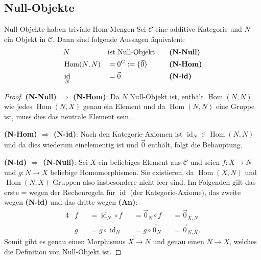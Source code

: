 \documentclass[a4paper]{amsart}
\theoremstyle{definition}
\DeclareMathOperator{\id}{id}
\DeclareMathOperator{\Hom}{Hom}
\newcommand{\CC}{\ensuremath{\mathcal{ C }}}
\begin{document}
\subsection{Null-Objekte}
\begin{Satz}{Null-Objekte haben triviale Hom-Mengen}
   Sei $\CC$ eine additive Kategorie und $N$ ein Objekt in $\CC$. Dann sind folgende Aussagen äquivalent:
   \begin{alignat}{3}
      &N            && \text{ist Null-Objekt}  &&\quad \text{\textbf{(N-Null)}}\\
      &\Hom( N, N ) && = 0^G := \{ \vec 0   \} &&\quad \text{\textbf{(N-Hom)}}\\
      &\id_N        && = \vec 0                &&\quad \text{\textbf{(N-id)}}
   \end{alignat}
\end{Satz}
\begin{proof}
   \textbf{(N-Null) $\Rightarrow$ (N-Hom)}: Da $N$ Null-Objekt ist, enthält $\Hom(N,N)$ wie jedes $\Hom(N,X)$ genau ein Element und da $\Hom(N,N)$ eine Gruppe ist, muss dies das neutrale Element sein.
   
   \textbf{(N-Hom) $\Rightarrow$ (N-id)}: Nach den Kategorie-Axiomen ist $\id_N \in \Hom(N,N)$ und da dies wiederum einelementig ist und $\vec 0$ enthält, folgt die Behauptung.
   
   \textbf{(N-id) $\Rightarrow$ (N-Null)}: Sei $X$ ein beliebiges Element aus $\CC$ und seien $f \colon X \to N$ und $g \colon N \to X$ beliebige Homomorphismen. Sie existieren, da $\Hom( X, N)$ und $\Hom( N, X)$ Gruppen also insbesondere nicht leer sind. Im Folgenden gilt das erste = wegen der Rechenregeln für $\id$ (der Kategorie-Axiome), das zweite wegen \textbf{(N-id)} und das dritte wegen \textbf{(An)}:
   \begin{alignat}{4}
      &f &&= \id_N \circ f  &&= \vec 0_N \circ f &&= \vec 0_{X,N} \\
      &g &&= g \circ \id_N  &&= g \circ \vec 0_N &&= \vec 0_{N,X}.
   \end{alignat}
   Somit gibt es genau einen Morphismus $X \to N$ und genau einen $N \to X$, welches die Definition von Null-Objekt ist.
\end{proof}

\end{document}
